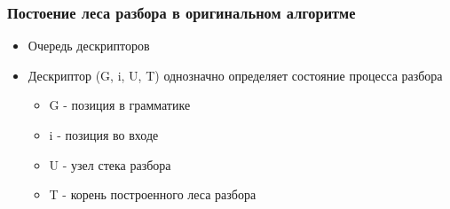 \documentclass{beamer}
\begin{document}
	\begin{frame} 
		\frametitle{Постоение леса разбора в оригинальном алгоритме}
		\begin{itemize}
			\item Очередь дескрипторов
			\item Дескриптор (G, i, U, T) однозначно определяет состояние процесса разбора
			\begin{itemize}
				\item G - позиция в грамматике
				\item i - позиция во входе
				\item U - узел стека разбора
				\item T - корень построенного леса разбора
			\end{itemize}
		\end{itemize}
	\end{frame}
%			
\end{document}

